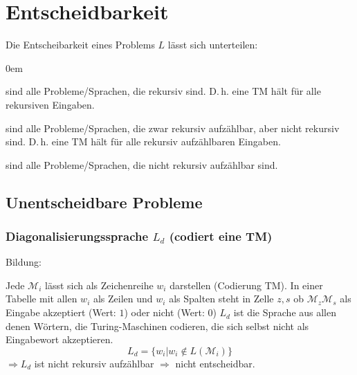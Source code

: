\section{Entscheidbarkeit}
Die Entscheibarkeit eines Problems $L$ lässt sich unterteilen:
\begin{description}\itemsep0em
	\item [Entscheibar] sind alle Probleme/Sprachen, die rekursiv sind. D.\,h. eine TM hält für alle rekursiven Eingaben.
	\item [Semi-entscheidbar] sind alle Probleme/Sprachen, die zwar rekursiv aufzählbar, aber nicht rekursiv sind.
	D.\,h. eine TM hält für alle rekursiv aufzählbaren Eingaben.
	\item [Unentscheidbar] sind alle Probleme/Sprachen, die nicht rekursiv aufzählbar sind. 
\end{description}


\subsection{Unentscheidbare Probleme}
\subsubsection{Diagonalisierungssprache $L_d$ (codiert eine TM)}
Bildung:


Jede $\mathcal{M}_i$ lässt sich als Zeichenreihe $w_i$ darstellen (Codierung TM). In einer Tabelle mit allen $w_i$ als Zeilen und $w_i$ als Spalten steht in Zelle $z, s$ ob $\mathcal{M}_z \mathcal{M}_s$ als Eingabe akzeptiert (Wert: $1$) oder nicht (Wert: $0$) $L_d$ ist die Sprache aus allen denen Wörtern, die Turing-Maschinen codieren, die sich selbst nicht als Eingabewort akzeptieren. 
\begin{equation*}
L_d = \{w_i | w_i \notin L(\mathcal{M}_i)\}
\end{equation*}
$\Rightarrow L_d$ ist nicht rekursiv aufzählbar $\Rightarrow$ nicht entscheidbar.\\

